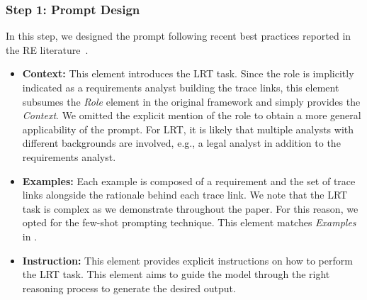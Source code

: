 \subsubsection*{Step 1: Prompt Design}
In this step, we designed the prompt following recent best practices reported in the RE literature~\cite{vogelsang2024using,vogelsang2024specifications}. 
\begin{itemize}
    \item \textbf{Context:} This element introduces the LRT task. Since the role is implicitly indicated as a requirements analyst building the trace links, this element subsumes the \textit{Role} element in the original 
    \RICE framework and simply provides  the \textit{Context}. We omitted the explicit mention of the role to obtain a more general applicability of the prompt. 
    For LRT, it is likely that multiple analysts with different backgrounds are involved, e.g., a legal analyst in addition to the requirements analyst. %
    \item \textbf{Examples:}  Each example is composed of a requirement and the set of trace links alongside the rationale behind each trace link. We note that the LRT task is complex as we demonstrate throughout the paper. For this reason, we opted for the few-shot prompting technique. This element matches \textit{Examples} in \RICE. 
    \item \textbf{Instruction:} This element provides explicit instructions on how to perform the LRT task. This element 
    aims to guide the model through the right reasoning process to generate the desired output. 

\end{itemize}
